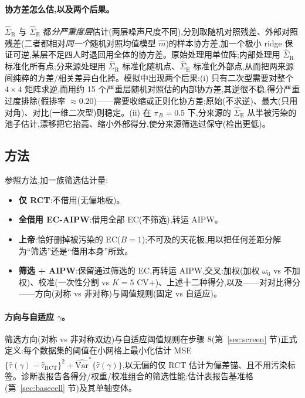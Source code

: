 \documentclass[11pt]{article}
\newcommand{\R}{\mathrm{R}}
\newcommand{\E}{\mathrm{E}}
\begin{document}
\paragraph{协方差怎么估,以及两个后果。}
$\widehat\Sigma_{\R}$ 与 $\widehat\Sigma_{\E}$ 都\emph{分严重度层}估计(两层噪声尺度不同),分别取随机对照残差、外部对照残差(二者都相对\emph{同一个}随机对照均值模型 $\widehat m$)的样本协方差,加一个极小 ridge 保证可逆,某层不足四人时退回用全体的协方差。原始处理用单位阵;内部处理用 $\widehat\Sigma_{\R}$ 标准化所有点;分来源处理用 $\widehat\Sigma_{\R}$ 标准化随机点、$\widehat\Sigma_{\E}$ 标准化外部点,从而把两来源间纯粹的方差/相关差异白化掉。模拟中出现两个后果:(i) 只有二次型需要对整个 $4\times4$ 矩阵求逆,而用约 15 个严重层随机对照估的内部协方差,其逆很不稳,得分严重过度排除(假排率 $\approx0.20$)——需要收缩或正则化协方差;原始(不求逆)、最大(只用对角)、对比(一维二次型)则稳定。(ii) 在 $\pi_B=0.5$ 下,分来源的 $\widehat\Sigma_{\E}$ 从半被污染的池子估计,漂移把它抬高、缩小外部得分,使分来源筛选过保守(检出更低)。

\subsection{方法}

参照方法,加一族筛选估计量:
\begin{itemize}
    \item \textbf{仅 RCT}:不借用(无偏地板)。
    \item \textbf{全借用 EC-AIPW}:借用全部 EC(不筛选),转运 AIPW。
    \item \textbf{上帝}:恰好删掉被污染的 EC($B{=}1$);不可及的天花板,用以把任何差距分解为``筛选''还是``借用本身''所致。
    \item \textbf{筛选 + AIPW}:保留通过筛选的 EC,再转运 AIPW,交叉:加权(加权 $\omega_0$ vs 不加权)、校准(一次性分割 vs $K=5$ CV+)、上述十二种得分,以及——对对比得分——方向(对称 vs 非对称)与阈值规则(固定 vs 自适应)。
\end{itemize}

\paragraph{方向与自适应 $\gamma$。}
筛选方向(对称 vs 非对称双边)与自适应阈值规则在步骤 8(第~\ref{sec:screen} 节)正式定义:每个数据集的阈值在小网格上最小化估计 MSE $\{\widehat\tau(\gamma)-\widehat\tau_{\mathrm{RCT}}\}^2+\widehat{\mathrm{Var}}^{\ast}\{\widehat\tau(\gamma)\}$,以无偏的仅 RCT 估计为偏差锚、且不用污染标签。诊断表报告各得分/权重/校准组合的筛选性能;估计表报告基准格(第~\ref{sec:basecell} 节)及其单轴变体。
\end{document}
